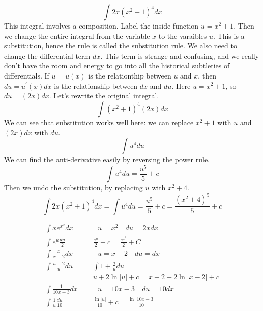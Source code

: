 \documentclass[fleqn]{report}
\begin{document}
\begin{example} 
\begin{equation*}
\int 2x (x^2+1)^4 dx 
\end{equation*}
This integral involves a composition. 
Label the inside function $u = x^2 + 1$. Then we
change the entire integral from the variable $x$
to the varaibles $u$. This is a substitution, hence the rule
is called the substitution rule.
We also need to change the differential term $dx$. This term
is strange and confusing, and we really don't have the room
and energy to go into all the historical subtleties of
differentials. If $u =
u(x)$ is the relationthip between $u$ and $x$, then $du =
u^\prime(x) dx$ is the relationship between $dx$ and $du$.
Here $u = x^2 +1$, so $du = (2x) dx$. Let's
rewrite the original integral.
\begin{equation*}
\int (x^2+1)^4 (2x)dx 
\end{equation*}
We can see that substitution works well here: we can
replace $x^2 +1$ with $u$ and $(2x) dx$ with $du$. 
\begin{equation*}
\int u^4 du 
\end{equation*}
We can find the anti-derivative easily by reversing the power
rule.
\begin{equation*}
\int u^4 du = \frac{u^5}{5} + c
\end{equation*}
Then we undo the substitution, by replacing $u$ with $x^2+4$.
\begin{equation*}
\int 2x (x^2+1)^4 dx = \int u^4 du = \frac{u^5}{5} + c =
\frac{(x^2+4)^5}{5} + c
\end{equation*}
\end{example}

\begin{example}
\begin{align*}
\int xe^{x^2} dx & \quad \quad u=x^2 \quad du = 2xdx \\
\int e^u \frac{du}{2} & = \frac{e^u}{2} + c = \frac{e^{x^2}}{2} +
C \\
\int \frac{x}{x-2} dx & \quad \quad u = x-2 \quad du = dx \\
\int \frac{u+2}{u} du & = \int 1 + \frac{2}{u} du \\
& = u + 2 \ln |u| + c = x - 2 + 2\ln|x-2| + c \\
\int \frac{1}{10x-3} dx & \quad \quad u = 10x-3 \quad du = 10dx
\\
\int \frac{1}{u} \frac{du}{10} & = \frac{\ln |u|}{10} + c =
\frac{ \ln| 10x -3 |}{10}
\end{align*}
\end{example}
\end{document}
